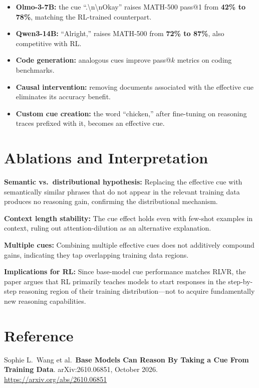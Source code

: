 \documentclass[10pt,twocolumn]{article}
\begin{document}
\begin{itemize}[itemsep=2pt,parsep=0pt]
  \item \textbf{Olmo-3-7B:} the cue ``.\textbackslash n\textbackslash nOkay'' raises
    MATH-500 pass@1 from \textbf{42\% to 78\%}, matching the RL-trained counterpart.
  \item \textbf{Qwen3-14B:} ``Alright,'' raises MATH-500 from \textbf{72\% to 87\%},
    also competitive with RL.
  \item \textbf{Code generation:} analogous cues improve pass@$k$ metrics on
    coding benchmarks.
  \item \textbf{Causal intervention:} removing documents associated with the
    effective cue eliminates its accuracy benefit.
  \item \textbf{Custom cue creation:} the word ``chicken,'' after fine-tuning on
    reasoning traces prefixed with it, becomes an effective cue.
\end{itemize}

\section{Ablations and Interpretation}

\textbf{Semantic vs.\ distributional hypothesis:} Replacing the effective cue with
semantically similar phrases that do not appear in the relevant training data
produces no reasoning gain, confirming the distributional mechanism.

\textbf{Context length stability:} The cue effect holds even with few-shot examples
in context, ruling out attention-dilution as an alternative explanation.

\textbf{Multiple cues:} Combining multiple effective cues does not additively
compound gains, indicating they tap overlapping training data regions.

\textbf{Implications for RL:} Since base-model cue performance matches RLVR, the
paper argues that RL primarily teaches models to start responses in
the step-by-step reasoning region of their training distribution---not to
acquire fundamentally new reasoning capabilities.

\section*{Reference}

Sophie L.\ Wang et al.\
\textbf{Base Models Can Reason By Taking a Cue From Training Data}.
arXiv:2610.06851, October 2026.\\
\url{https://arxiv.org/abs/2610.06851}
\end{document}
